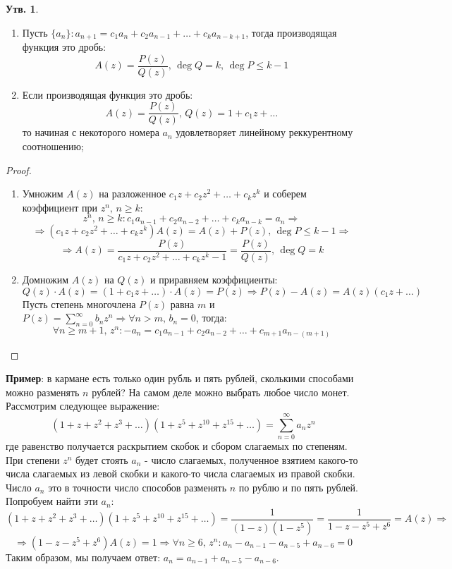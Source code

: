\documentclass[12pt]{article}
\theoremstyle{definition}
\newtheorem{prop}{Утв.}
\newcommand{\ddsum}[2]{\displaystyle\sum\limits_{#1}^{#2}}
\begin{document}
\begin{prop}\hfill
	\begin{enumerate}[label=\arabic*)]
		\item 	Пусть $\{a_n\} \colon a_{n+1} = c_1 a_n + c_2 a_{n-1} + \dotsc + c_k a_{n -k + 1}$, тогда производящая функция это дробь:
		$$
			A(z) = \dfrac{P(z)}{Q(z)}, \, \deg{Q} = k, \, \deg{P} \leq k-1
		$$
		\item Если производящая функция это дробь: 
		$$
			A(z) = \dfrac{P(z)}{Q(z)}, \, Q(z) = 1 + c_1 z + \dotsc
		$$ 
		то начиная с некоторого номера $a_n$ удовлетворяет линейному реккурентному соотношению;
	\end{enumerate}
\end{prop}
\begin{proof}\hfill
	\begin{enumerate}[label=\arabic*)]
		\item Умножим $A(z)$ на разложенное $c_1 z + c_2 z^2 + \dotsc + c_kz^k$ и соберем коэффициент при $z^n, \, n \geq k$:
		$$
			z^n, \, n \geq k \colon c_1 a_{n-1} + c_2 a_{n-2} + \dotsc + c_k a_{n - k} = a_n \Rightarrow 
		$$
		$$
			\Rightarrow (c_1 z + c_2 z^2 + \dotsc + c_kz^k)A(z) = A(z) + P(z), \, \deg{P} \leq k -1 \Rightarrow
		$$
		$$
			\Rightarrow A(z) = \dfrac{P(z)}{c_1 z + c_2 z^2 + \dotsc + c_kz^k - 1} = \dfrac{P(z)}{Q(z)}, \, \deg{Q} = k
		$$
		\item Домножим $A(z)$ на $Q(z)$ и приравняем коэффициенты:
		$$
			Q(z){\cdot}A(z) = (1 + c_1 z + \dotsc ){\cdot}A(z) = P(z) \Rightarrow P(z) - A(z) = A(z)(c_1 z + \dotsc )
		$$
		Пусть степень многочлена $P(z)$ равна $m$ и $P(z) = \ddsum{n = 0}{\infty}b_n z^n \Rightarrow \forall n > m, \, b_n = 0$, тогда:
		$$
			\forall n \geq m + 1, \, z^n \colon - a_n = c_1 a_{n-1} + c_2 a_{n - 2} + \dotsc + c_{m  + 1}a_{n - (m +1)}
		$$
	\end{enumerate}
\end{proof}

\textbf{Пример}: в кармане есть только один рубль и пять рублей, сколькими способами можно разменять $n$ рублей? На самом деле можно выбрать любое число монет. Рассмотрим следующее выражение:
$$
	(1 + z + z^2 + z^3 + \dotsc)(1 + z^5 + z^{10} + z^{15} + \dotsc ) = \ddsum{n = 0}{\infty}a_n z^n
$$
где равенство получается раскрытием скобок и сбором слагаемых по степеням. При степени $z^n$ будет стоять $a_n$ - число слагаемых, полученное взятием какого-то числа слагаемых из левой скобки и какого-то числа слагаемых из правой скобки. Число $a_n$ это в точности число способов разменять $n$ по рублю и по пять рублей. Попробуем найти эти $a_n$:
$$
	(1 + z + z^2 + z^3 + \dotsc)(1 + z^5 + z^{10} + z^{15} + \dotsc ) = \dfrac{1}{(1 - z)(1-z^5)} = \dfrac{1}{1 - z - z^5 + z^6} = A(z) \Rightarrow
$$
$$
	\Rightarrow (1 - z - z^5 + z^6)A(z) = 1 \Rightarrow \forall n \geq 6, \, z^n: a_n - a_{n-1} - a_{n -5} + a_{n -6} = 0 
$$
Таким образом, мы получаем ответ: $a_n = a_{n-1} + a_{n -5} - a_{n -6}$.
\end{document}
